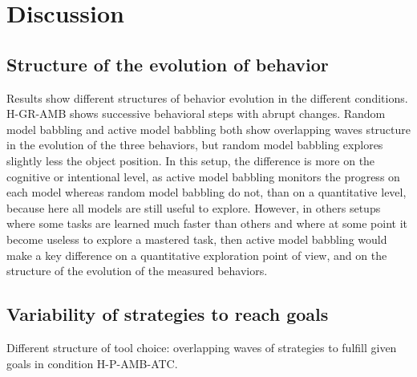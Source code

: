 \documentclass[10pt,letterpaper]{article}
\begin{document}
%


\section{Discussion}

	\subsection{Structure of the evolution of behavior}
	
		Results show different structures of behavior evolution in the different conditions.
		H-GR-AMB shows successive behavioral steps with abrupt changes.
		Random model babbling and active model babbling both show overlapping waves structure in the evolution of the three behaviors, 
		but random model babbling explores slightly less the object position.
		In this setup, the difference is more on the cognitive or intentional level, as active model babbling monitors the progress on each model whereas random model babbling do not, than on a quantitative level, 
		because here all models are still useful to explore.
		However, in others setups where some tasks are learned much faster than others and where at some point it become useless to explore a mastered task, then active model babbling would
		make a key difference on a quantitative exploration point of view, and on the structure of the evolution of the measured behaviors.
	
	
	\subsection{Variability of strategies to reach goals}
	
		Different structure of tool choice: overlapping waves of strategies to fulfill given goals in condition H-P-AMB-ATC.
	
	
%






\setlength{\bibleftmargin}{.125in}
\setlength{\bibindent}{-\bibleftmargin}


\end{document}
